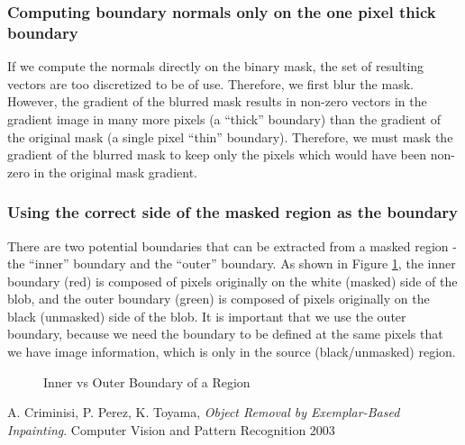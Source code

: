 \documentclass{InsightArticle}
\begin{document}
\subsubsection{Computing boundary normals only on the one pixel thick boundary}
If we compute the normals directly on the binary mask, the set of resulting vectors are too discretized to be of use. Therefore, we first blur the mask. However, the gradient of the blurred mask results in non-zero vectors in the gradient image in many more pixels (a ``thick'' boundary) than the gradient of the original mask (a single pixel ``thin'' boundary). Therefore, we must mask the gradient of the blurred mask to keep only the pixels which would have been non-zero in the original mask gradient.


\subsubsection{Using the correct side of the masked region as the boundary}
There are two potential boundaries that can be extracted from a masked region - the ``inner'' boundary and the ``outer'' boundary. As shown in Figure \ref{fig:BoundarySide}, the inner boundary (red) is composed of pixels originally on the white (masked) side of the blob, and the outer boundary (green) is composed of pixels originally on the black (unmasked) side of the blob. It is important that we use the outer boundary, because we need the boundary to be defined at the same pixels that we have image information, which is only in the source (black/unmasked) region.

\begin{figure}[H]
\centering
{}
\caption{Inner vs Outer Boundary of a Region}
\label{fig:BoundarySide}
\end{figure}


\begin{thebibliography}{9}

	  A. Criminisi, P. Perez, K. Toyama,
	  \emph{Object Removal by Exemplar-Based Inpainting}.
	  Computer Vision and Pattern Recognition 2003

\end{thebibliography}
\end{document}
